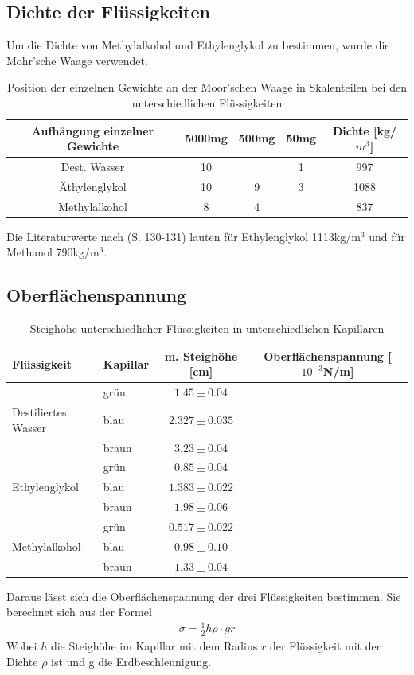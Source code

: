 \documentclass[12pt,a4paper,titlepage,headinclude,bibtotoc]{scrartcl}
\begin{document}
\subsection{Dichte der Flüssigkeiten}
Um die Dichte von Methylalkohol und Ethylenglykol zu bestimmen, wurde die Mohr'sche Waage verwendet.
\begin{table}
\centering
\begin{tabular}{|c|c|c|c|c|}
\hline Aufhängung einzelner Gewichte & 5000mg & 500mg & 50mg &Dichte [kg/$m^3$]\\
\hline Dest. Wasser  & 10	&	& 1	& 997	\\
\hline Äthylenglykol & 10	& 9	& 3	& 1088	\\
\hline Methylalkohol & 8	& 4	& 	& 837	\\\hline
\end{tabular}
\caption{Position der einzelnen Gewichte an der Moor'schen Waage in Skalenteilen bei den unterschiedlichen Flüssigkeiten\label{tab:dichte}}
\end{table}
Die Literaturwerte nach \cite{Formelsammlung} (S. 130-131) lauten für Ethylenglykol 1113kg/m$^3$ und für Methanol 790kg/m$^3$.
\subsection{Oberflächenspannung}
\begin{table}[!h]
\centering
\begin{tabular}{|l|l|c|c|}
\hline
Flüssigkeit 		&Kapillar & m. Steighöhe [cm]	& Oberflächenspannung [$10^{-3}$N/m]\\\hline\hline
			&grün	& $1.45\pm 0.04$		&\\
Destiliertes Wasser	&blau	& $2.327\pm 0.035$		&\\
                        &braun  & $3.23\pm 0.04$		&\\\hline
			&grün	& $0.85\pm 0.04$		&\\
Ethylenglykol		&blau	& $1.383\pm 0.022$		&\\
			&braun	& $1.98\pm 0.06$		&\\\hline
			&grün	& $0.517\pm 0.022$		&\\
Methylalkohol		&blau	& $0.98\pm 0.10$		&\\
			&braun	& $1.33\pm 0.04$		&\\
\hline
\end{tabular}
\caption{Steighöhe unterschiedlicher Flüssigkeiten in unterschiedlichen Kapillaren}
\end{table}
Daraus lässt sich die Oberflächenspannung der drei Flüssigkeiten bestimmen.
Sie berechnet sich aus der Formel
\begin{align}
\sigma=\frac{1}{2}h\rho\cdot g r
\end{align} 
Wobei $h$ die Steighöhe im Kapillar mit dem Radius $r$ der Flüssigkeit mit der Dichte $\rho$ ist und g die Erdbeschleunigung.
\end{document}
